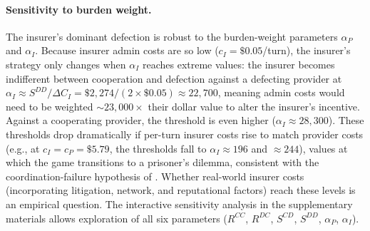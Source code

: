 \paragraph{Sensitivity to burden weight.}
The insurer's dominant defection is robust to the burden-weight parameters $\alpha_P$ and $\alpha_I$. Because insurer admin costs are so low ($c_I = \$0.05$/turn), the insurer's strategy only changes when $\alpha_I$ reaches extreme values: the insurer becomes indifferent between cooperation and defection against a defecting provider at $\alpha_I \approx S^{DD} / \Delta C_I = \$2{,}274 / (2 \times \$0.05) \approx 22{,}700$, meaning admin costs would need to be weighted ${\sim}23{,}000\times$ their dollar value to alter the insurer's incentive. Against a cooperating provider, the threshold is even higher ($\alpha_I \approx 28{,}300$). These thresholds drop dramatically if per-turn insurer costs rise to match provider costs (e.g., at $c_I = c_P = \$5.79$, the thresholds fall to $\alpha_I \approx 196$ and $\approx 244$), values at which the game transitions to a prisoner's dilemma, consistent with the coordination-failure hypothesis of \citet{moritz2025lancet}. Whether real-world insurer costs (incorporating litigation, network, and reputational factors) reach these levels is an empirical question. The interactive sensitivity analysis in the supplementary materials allows exploration of all six parameters ($R^{CC}$, $R^{DC}$, $S^{CD}$, $S^{DD}$, $\alpha_P$, $\alpha_I$).

